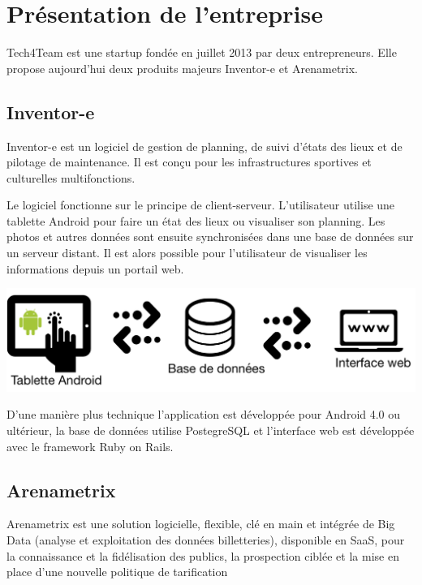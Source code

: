 

\chapter{Présentation de l'entreprise}


Tech4Team est une startup fondée en juillet 2013 par deux entrepreneurs. Elle propose aujourd'hui deux produits majeurs Inventor-e et Arenametrix.

\section{Inventor-e}
Inventor-e est un logiciel de gestion de planning, de suivi d’états des lieux et de pilotage de maintenance. Il est conçu pour les infrastructures sportives et culturelles multifonctions.

Le logiciel fonctionne sur le principe de client-serveur. L'utilisateur utilise une tablette Android pour faire un état des lieux ou visualiser son planning. Les photos et autres données sont ensuite synchronisées dans une base de données sur un serveur distant. Il est alors possible pour l'utilisateur de visualiser les informations depuis un portail web.

\begin{center}
\includegraphics[scale=0.7]{images/inventore.png}
\label{inventore}
\end{center}

D'une manière plus technique l'application est développée pour Android 4.0 ou ultérieur, la base de données utilise PostegreSQL et l'interface web est développée avec le framework Ruby on Rails.

\section{Arenametrix}
Arenametrix est une solution logicielle, flexible, clé en main et intégrée de Big Data (analyse et exploitation des données billetteries), disponible en SaaS, pour la connaissance et la fidélisation des publics, la prospection ciblée et la mise en place d'une nouvelle politique de tarification


